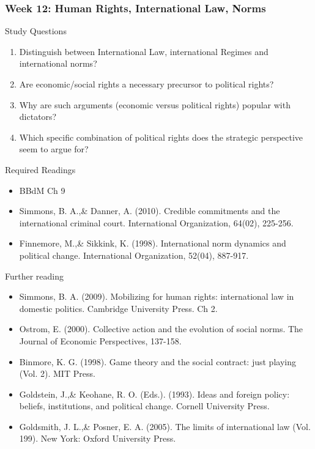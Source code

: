 \documentclass[12pt,a4paper]{article}
\begin{document}
 

\subsubsection*{Week 12: Human Rights, International Law, Norms}

Study Questions

\begin{enumerate}
	\item Distinguish between International Law, international Regimes and international norms?
	\item Are economic/social rights a necessary precursor to political rights?
	\item Why are such arguments (economic versus political rights) popular with dictators?
	\item Which specific combination of political rights does the strategic perspective seem to argue for?
\end{enumerate}

\noindent Required Readings

\begin{itemize}
	\item BBdM Ch 9
	\item Simmons, B. A.,\& Danner, A. (2010). Credible commitments and the international criminal court. International Organization, 64(02), 225-256.
	\item Finnemore, M.,\& Sikkink, K. (1998). International norm dynamics and political change. International Organization, 52(04), 887-917.
\end{itemize}

\noindent Further reading

\begin{itemize}
	\item  Simmons, B. A. (2009). Mobilizing for human rights: international law in domestic politics. Cambridge University Press. Ch 2.
	\item Ostrom, E. (2000). Collective action and the evolution of social norms. The Journal of Economic Perspectives, 137-158.
	\item Binmore, K. G. (1998). Game theory and the social contract: just playing (Vol. 2). MIT Press.
	\item Goldstein, J.,\& Keohane, R. O. (Eds.). (1993). Ideas and foreign policy: beliefs, institutions, and political change. Cornell University Press.
	\item Goldsmith, J. L.,\& Posner, E. A. (2005). The limits of international law (Vol. 199). New York: Oxford University Press.
\end{itemize}
\end{document}
